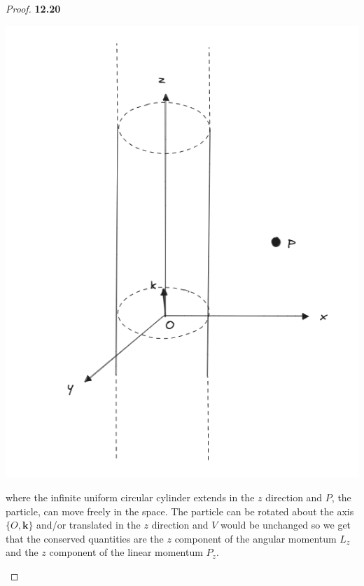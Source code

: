 \documentclass[11pt]{article}
\theoremstyle{definition}
\begin{document}
\begin{proof}{\textbf{12.20}}
\begin{itemize}
\begin{center}
        \includegraphics[scale=0.4]{ch12-20-v.png}
    \end{center}
    where the infinite uniform circular cylinder extends in the $z$ direction
    and $P$, the particle, can move freely in the space.
    The particle can be rotated about the axis $\{O,\bm{k}\}$
    and/or translated in the $z$ direction and $V$ would be unchanged
    so we get that the conserved quantities are the $z$ component of
    the angular momentum $L_z$ and the $z$ component of the linear momentum
    $P_z$.
    \end{itemize}
\end{proof}
\cleardoublepage
\end{document}
